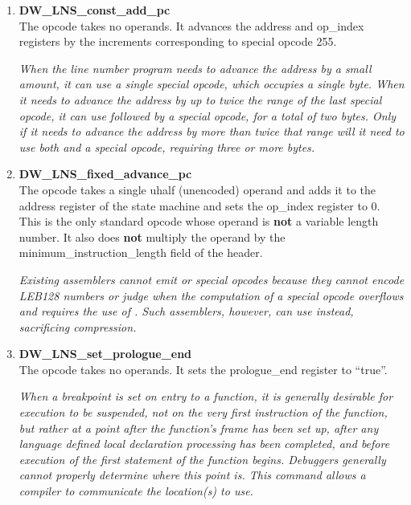 \begin{enumerate}[1.]
\item \textbf{DW\-\_LNS\-\_const\-\_add\-\_pc} \\
The  opcode takes
no operands. It advances the address and op\_index registers
by the increments corresponding to special opcode 255.

\textit{When the line number program needs to advance the address
by a small amount, it can use a single special opcode,
which occupies a single byte. When it needs to advance the
address by up to twice the range of the last special opcode,
it can use  followed by a special opcode,
for a total of two bytes. Only if it needs to advance the
address by more than twice that range will it need to use
both  and a special opcode, requiring three
or more bytes.}

\item \textbf{DW\-\_LNS\-\_fixed\-\_advance\-\_pc} \\ 
The  opcode
takes a single uhalf (unencoded) operand and adds it to the
address register of the state machine and sets the op\_index
register to 0. This is the only standard opcode whose operand
is \textbf{not} a variable length number. It also does 
\textbf{not} multiply the
operand by the minimum\_instruction\_length field of the header.

\textit{Existing assemblers cannot emit  or special
opcodes because they cannot encode LEB128 numbers or judge when
the computation of a special opcode overflows and requires
the use of . Such assemblers, however, can
use  instead, sacrificing compression.}

\item \textbf{DW\-\_LNS\-\_set\-\_prologue\-\_end} \\
The 
opcode takes no operands. It sets the prologue\_end register
to ``true''.

\textit{When a breakpoint is set on entry to a function, it is
generally desirable for execution to be suspended, not on the
very first instruction of the function, but rather at a point
after the function's frame has been set up, after any language
defined local declaration processing has been completed,
and before execution of the first statement of the function
begins. Debuggers generally cannot properly determine where
this point is. This command allows a compiler to communicate
the location(s) to use.}


\end{enumerate}
